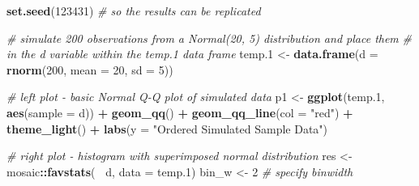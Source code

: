 \documentclass[
]{book}
\newenvironment{Shaded}{\begin{snugshade}}{\end{snugshade}}
\newcommand{\CommentTok}[1]{\textcolor[rgb]{0.56,0.35,0.01}{\textit{#1}}}
\newcommand{\DataTypeTok}[1]{\textcolor[rgb]{0.13,0.29,0.53}{#1}}
\newcommand{\DecValTok}[1]{\textcolor[rgb]{0.00,0.00,0.81}{#1}}
\newcommand{\FloatTok}[1]{\textcolor[rgb]{0.00,0.00,0.81}{#1}}
\newcommand{\KeywordTok}[1]{\textcolor[rgb]{0.13,0.29,0.53}{\textbf{#1}}}
\newcommand{\NormalTok}[1]{#1}
\newcommand{\OperatorTok}[1]{\textcolor[rgb]{0.81,0.36,0.00}{\textbf{#1}}}
\newcommand{\StringTok}[1]{\textcolor[rgb]{0.31,0.60,0.02}{#1}}
\begin{document}
\begin{Shaded}
\begin{Highlighting}[]
\KeywordTok{set.seed}\NormalTok{(}\DecValTok{123431}\NormalTok{) }\CommentTok{# so the results can be replicated}
                                          
\CommentTok{# simulate 200 observations from a Normal(20, 5) distribution and place them }
\CommentTok{# in the d variable within the temp.1 data frame}
\NormalTok{temp}\FloatTok{.1}\NormalTok{ <-}\StringTok{ }\KeywordTok{data.frame}\NormalTok{(}\DataTypeTok{d =} \KeywordTok{rnorm}\NormalTok{(}\DecValTok{200}\NormalTok{, }\DataTypeTok{mean =} \DecValTok{20}\NormalTok{, }\DataTypeTok{sd =} \DecValTok{5}\NormalTok{)) }
                                          
\CommentTok{# left plot - basic Normal Q-Q plot of simulated data}
\NormalTok{p1 <-}\StringTok{ }\KeywordTok{ggplot}\NormalTok{(temp}\FloatTok{.1}\NormalTok{, }\KeywordTok{aes}\NormalTok{(}\DataTypeTok{sample =}\NormalTok{ d)) }\OperatorTok{+}
\StringTok{    }\KeywordTok{geom_qq}\NormalTok{() }\OperatorTok{+}\StringTok{ }\KeywordTok{geom_qq_line}\NormalTok{(}\DataTypeTok{col =} \StringTok{"red"}\NormalTok{) }\OperatorTok{+}
\StringTok{    }\KeywordTok{theme_light}\NormalTok{() }\OperatorTok{+}
\StringTok{    }\KeywordTok{labs}\NormalTok{(}\DataTypeTok{y =} \StringTok{"Ordered Simulated Sample Data"}\NormalTok{)}

\CommentTok{# right plot - histogram with superimposed normal distribution}
\NormalTok{res <-}\StringTok{ }\NormalTok{mosaic}\OperatorTok{::}\KeywordTok{favstats}\NormalTok{(}\OperatorTok{~}\StringTok{ }\NormalTok{d, }\DataTypeTok{data =}\NormalTok{ temp}\FloatTok{.1}\NormalTok{)}
\NormalTok{bin_w <-}\StringTok{ }\DecValTok{2} \CommentTok{# specify binwidth}


\end{Highlighting}
\end{Shaded}
\end{document}
